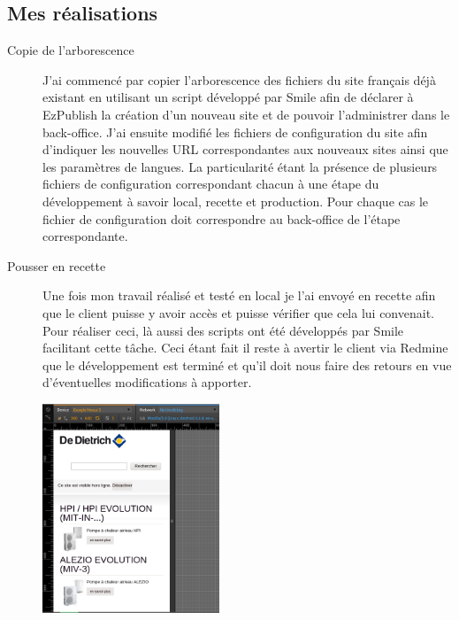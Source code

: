 \documentclass[a4paper,11pt,twoside]{report}
\begin{document}
    \subsection*{Mes réalisations}
      \begin{description}

	\item[Copie de l'arborescence] J'ai commencé par copier l'arborescence des fichiers du site français déjà existant en utilisant un script développé par Smile afin de déclarer à EzPublish la création d'un nouveau site et de pouvoir l'administrer dans le back-office. J'ai ensuite modifié les fichiers de configuration du site afin d'indiquer les nouvelles URL correspondantes aux nouveaux sites ainsi que les paramètres de langues. La particularité étant la présence de plusieurs fichiers de configuration correspondant chacun à une étape du développement à savoir local, recette et production. Pour chaque cas le fichier de configuration doit correspondre au back-office de l'étape correspondante.  
	\item[Pousser en recette] Une fois mon travail réalisé et testé en local je l'ai envoyé en recette afin que le client puisse y avoir accès et puisse vérifier que cela lui convenait. Pour réaliser ceci, là aussi des scripts ont été développés par Smile facilitant cette tâche. Ceci étant fait il reste à avertir le client via Redmine que le développement est terminé et qu'il doit nous faire des retours en vue d'éventuelles modifications à apporter.
	\begin{center}
	  \includegraphics[width=200]{images/DDTH_home_be_fr.png} 

\end{center}
\end{description}
\end{document}
